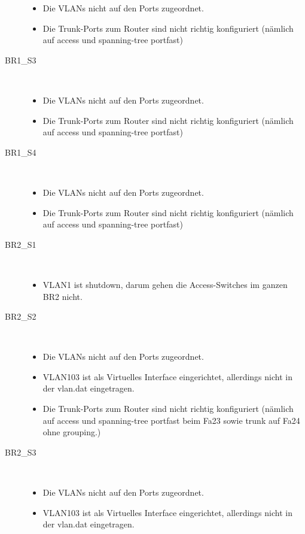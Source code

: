 \begin{description}
	  \begin{itemize} 
		  \item Die VLANs nicht auf den Ports zugeordnet.
		  \item Die Trunk-Ports zum Router sind nicht richtig konfiguriert (nämlich auf access und spanning-tree portfast)
	  \end{itemize}
	\item[BR1\_S3] \hfill \\
	  \begin{itemize} 
		  \item Die VLANs nicht auf den Ports zugeordnet. 
		  \item Die Trunk-Ports zum Router sind nicht richtig konfiguriert (nämlich auf access und spanning-tree portfast)
	  \end{itemize}
	\item[BR1\_S4] \hfill \\
	  \begin{itemize} 
		  \item Die VLANs nicht auf den Ports zugeordnet. 
		  \item Die Trunk-Ports zum Router sind nicht richtig konfiguriert (nämlich auf access und spanning-tree portfast)
	  \end{itemize}
	\item[BR2\_S1] \hfill \\
		\begin{itemize}
			\item VLAN1 ist shutdown, darum gehen die Access-Switches im ganzen BR2 nicht.
		\end{itemize}
	\item[BR2\_S2] \hfill \\
	  \begin{itemize}
		  \item Die VLANs nicht auf den Ports zugeordnet.
		  \item VLAN103 ist als Virtuelles Interface eingerichtet, allerdings nicht in der vlan.dat eingetragen.
		  \item Die Trunk-Ports zum Router sind nicht richtig konfiguriert (nämlich auf access und spanning-tree portfast beim Fa23 sowie trunk auf Fa24 ohne grouping.)
		\end{itemize}
	\item[BR2\_S3] \hfill \\
	  \begin{itemize}
	  	\item Die VLANs nicht auf den Ports zugeordnet.
		  \item VLAN103 ist als Virtuelles Interface eingerichtet, allerdings nicht in der vlan.dat eingetragen.

\end{itemize}
\end{description}
